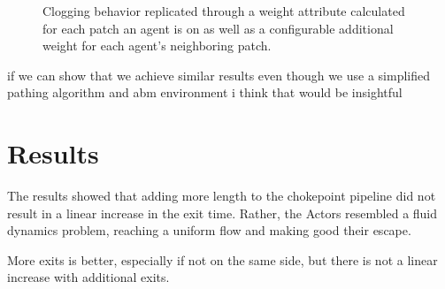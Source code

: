 \documentclass[12pt,letterpaper]{article}
\begin{document}
\begin{figure}[!htbp]
  \centering
  \hfill
  \caption{Clogging behavior replicated through a weight attribute calculated for each patch an agent is on as well as a configurable additional weight for each agent's neighboring patch. }
\end{figure}


if we can show that we achieve similar results even though we use a simplified pathing algorithm and abm environment i think that would be insightful



\section{Results}

The results showed that adding more length to the chokepoint pipeline did not
result in a linear increase in the exit time. Rather, the Actors resembled a
fluid dynamics problem, reaching a uniform flow and making good their escape.

More exits is better, especially if not on the same side, but there is not a
linear increase with additional exits.
\end{document}
